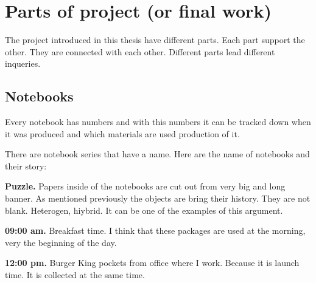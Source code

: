 {%






%
%
\section{Parts of project (or final work)}
The project introduced in this thesis have different parts. Each part support the other. They are connected with each other. Different parts lead different inqueries.

%
%
\subsection{Notebooks}


Every notebook has numbers and with this numbers it can be tracked down when it was produced and which materials are used production of it.

There are notebook series that have a name. Here are the name of notebooks and their story:

\textbf{Puzzle.} Papers inside of the notebooks are cut out from very big and long banner. As mentioned previously the objects are bring their history. They are not blank. Heterogen, hiybrid. It can be one of the examples of this argument.

\textbf{09:00 am.} Breakfast time. I think that these packages are used at the morning, very the beginning of the day.

\textbf{12:00 pm.} Burger King pockets from office where I work. Because it is launch time. It is collected at the same time.

}

